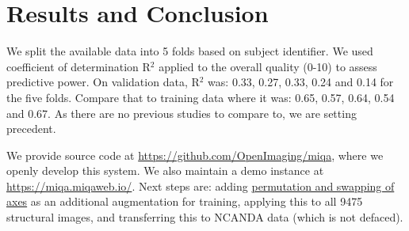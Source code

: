 \documentclass{midl} %
\begin{document}
\section{Results and Conclusion}

We split the available data into 5 folds based on subject identifier. We used coefficient of determination R$^2$ applied to the overall quality (0-10) to assess predictive power. On validation data, R$^2$ was: 0.33, 0.27, 0.33, 0.24 and 0.14 for the five folds. Compare that to training data where it was: 0.65, 0.57, 0.64, 0.54 and 0.67. As there are no previous studies to compare to, we are setting precedent.

We provide source code at \url{https://github.com/OpenImaging/miqa}, where we openly develop this system. We also maintain a demo instance at \url{https://miqa.miqaweb.io/}. Next steps are: adding \href{https://github.com/OpenImaging/miqa/pull/441}{permutation and swapping of axes} as an additional augmentation for training, applying this to all 9475 structural images, and transferring this to NCANDA data (which is not defaced).




\end{document}
